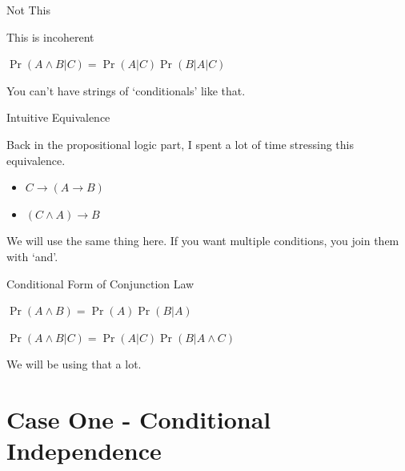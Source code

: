 \documentclass[
  ignorenonframetext,
]{beamer}
\providecommand{\tightlist}{%
  \setlength{\itemsep}{0pt}\setlength{\parskip}{0pt}}
\renewcommand{\,}{\text{, }}
\begin{document}
\begin{frame}{Not This}
\protect\hypertarget{not-this}{}

This is incoherent

\begin{description}
\tightlist
\item[Conditional]
\(\Pr(A \wedge B | C) = \Pr(A | C)\Pr(B | A | C)\)
\end{description}

You can't have strings of `conditionals' like that.

\end{frame}

\begin{frame}{Intuitive Equivalence}
\protect\hypertarget{intuitive-equivalence}{}

Back in the propositional logic part, I spent a lot of time stressing
this equivalence.

\begin{itemize}
\tightlist
\item
  \(C \rightarrow (A \rightarrow B)\)
\item
  \((C \wedge A) \rightarrow B\)
\end{itemize}

We will use the same thing here. If you want multiple conditions, you
join them with `and'.

\end{frame}

\begin{frame}{Conditional Form of Conjunction Law}
\protect\hypertarget{conditional-form-of-conjunction-law}{}

\begin{description}
\tightlist
\item[Unconditional]
\(\Pr(A \wedge B) = \Pr(A)\Pr(B | A)\)
\item[Conditional]
\(\Pr(A \wedge B | C) = \Pr(A | C)\Pr(B | A \wedge C)\) \pause
\end{description}

We will be using that a lot.

\end{frame}

\hypertarget{case-one---conditional-independence}{%
\section{Case One - Conditional
Independence}\label{case-one---conditional-independence}}
\end{document}
